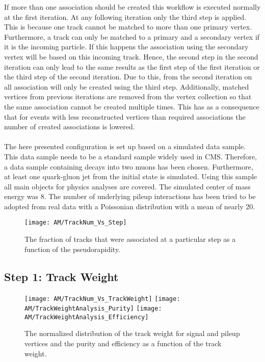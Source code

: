If more than one association should be created this workflow is executed normally at the first iteration. At any following iteration only the third step is applied. This is because one track cannot be matched to more than one primary vertex. Furthermore, a track can only be matched to a primary and a secondary vertex if it is the incoming particle. If this happens the association using the secondary vertex will be based on this incoming track. Hence, the second step in the second iteration can only lead to the same results as the first step of the first iteration or the third step of the second iteration. Due to this, from the second iteration on all association will only be created using the third step. Additionally, matched vertices from previous iterations are removed from the vertex collection so that the same association cannot be created multiple times. This has as a consequence that for events with less reconstructed vertices than required associations the number of created associations is lowered. \\ \\
The here presented configuration is set up based on a simulated data sample. This data sample needs to be a standard sample widely used in CMS. Therefore, a data sample containing \Zz decays into two muons has been chosen. Furthermore, at least one quark-gluon jet from the initial state is simulated. Using this sample all main objects for physics analyses are covered. The simulated center of mass energy was 8\TeV. The number of underlying pileup interactions has been tried to be adopted from real data with a Poissonian distribution with a mean of nearly 20.

\begin{figure}[!ht]
  \centering
  \texttt{[image: AM/TrackNum\_Vs\_Step]}
  \caption[Plot of the fraction of tracks to be associated at which step]{The fraction of tracks that were associated at a particular step as a function of the pseudorapidity.\label{plot:AMTrackStepFrac}}
\end{figure}

\subsection{Step 1: Track Weight \label{sec:AMWFTW}}

\begin{figure}[!ht]
  \centering
  \texttt{[image: AM/TrackNum\_Vs\_TrackWeight]}
  \texttt{[image: AM/TrackWeightAnalysis\_Purity]}
  \texttt{[image: AM/TrackWeightAnalysis\_Efficiency]}
  \caption[Distribution of the track weight and purity and efficiency vs track weight]{The normalized distribution of the track weight for signal and pileup vertices and the purity and efficiency as a function of the track weight.\label{plot:AMTWdistpureff}}
\end{figure}

